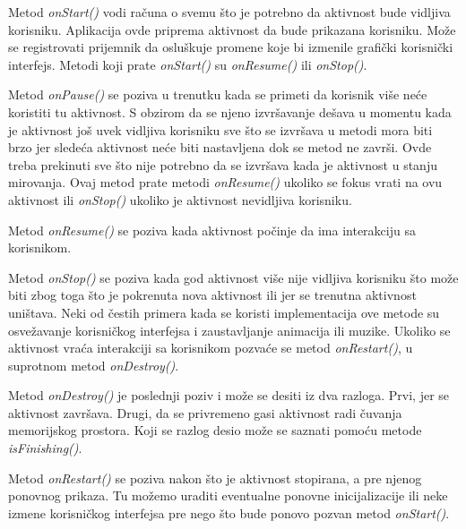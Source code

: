 \documentclass[android.tex]{subfiles}
\begin{document}
Metod \textit{onStart() }vodi računa o svemu što je potrebno da aktivnost bude vidljiva korisniku. Aplikacija ovde priprema aktivnost da bude prikazana korisniku. Može se registrovati prijemnik da osluškuje promene koje bi izmenile grafički korisnički interfejs. Metodi koji prate \textit{onStart()} su \textit{onResume() }ili \textit{onStop()}.

Metod \textit{onPause()} se poziva u trenutku kada se primeti da korisnik više neće koristiti tu aktivnost. S obzirom da se njeno izvršavanje dešava u momentu kada je aktivnost još uvek vidljiva korisniku sve što se izvršava u metodi mora biti brzo jer sledeća aktivnost neće biti nastavljena dok se metod ne završi. Ovde treba prekinuti sve što nije potrebno da se izvršava kada je aktivnost u stanju mirovanja. Ovaj metod prate metodi \textit{onResume()} ukoliko se fokus vrati na ovu aktivnost ili \textit{onStop() }ukoliko je aktivnost nevidljiva korisniku.

Metod \textit{onResume()} se poziva kada aktivnost počinje da ima interakciju sa korisnikom.

Metod \textit{onStop()} se poziva kada god aktivnost više nije vidljiva korisniku što može biti zbog toga što je pokrenuta nova aktivnost ili jer se trenutna aktivnost uništava. Neki od čestih primera kada se koristi implementacija ove metode su osvežavanje korisničkog interfejsa i zaustavljanje animacija ili muzike. Ukoliko se aktivnost vraća interakciji sa korisnikom pozvaće se metod \textit{onRestart()}, u suprotnom metod \textit{onDestroy()}.

Metod \textit{onDestroy()} je poslednji poziv i može se desiti iz dva razloga. Prvi, jer se aktivnost završava. Drugi, da se privremeno gasi aktivnost radi čuvanja memorijskog prostora. Koji se razlog desio može se saznati pomoću metode \textit{isFinishing()}.

Metod \textit{onRestart() }se poziva nakon što je aktivnost stopirana, a pre njenog ponovnog prikaza. Tu možemo uraditi eventualne ponovne inicijalizacije ili neke izmene korisničkog interfejsa pre nego što bude ponovo pozvan metod \textit{onStart()}.
\end{document}
